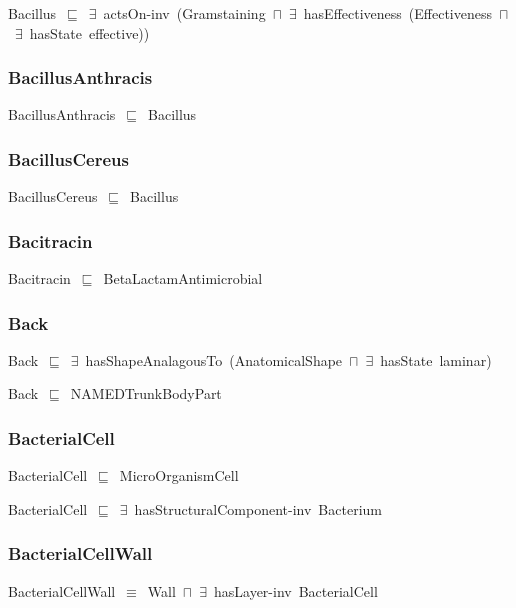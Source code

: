 \documentclass{article}
\begin{document}
Bacillus~\ensuremath{\sqsubseteq}~\ensuremath{\exists}~actsOn-inv~(Gramstaining~\ensuremath{\sqcap}~\ensuremath{\exists}~hasEffectiveness~(Effectiveness~\ensuremath{\sqcap}~\ensuremath{\exists}~hasState~effective))~

\subsubsection*{BacillusAnthracis}

BacillusAnthracis~\ensuremath{\sqsubseteq}~Bacillus~

\subsubsection*{BacillusCereus}

BacillusCereus~\ensuremath{\sqsubseteq}~Bacillus~

\subsubsection*{Bacitracin}

Bacitracin~\ensuremath{\sqsubseteq}~BetaLactamAntimicrobial~

\subsubsection*{Back}

Back~\ensuremath{\sqsubseteq}~\ensuremath{\exists}~hasShapeAnalagousTo~(AnatomicalShape~\ensuremath{\sqcap}~\ensuremath{\exists}~hasState~laminar)~

Back~\ensuremath{\sqsubseteq}~NAMEDTrunkBodyPart~

\subsubsection*{BacterialCell}

BacterialCell~\ensuremath{\sqsubseteq}~MicroOrganismCell~

BacterialCell~\ensuremath{\sqsubseteq}~\ensuremath{\exists}~hasStructuralComponent-inv~Bacterium~

\subsubsection*{BacterialCellWall}

BacterialCellWall~\ensuremath{\equiv}~Wall~\ensuremath{\sqcap}~\ensuremath{\exists}~hasLayer-inv~BacterialCell
\end{document}
